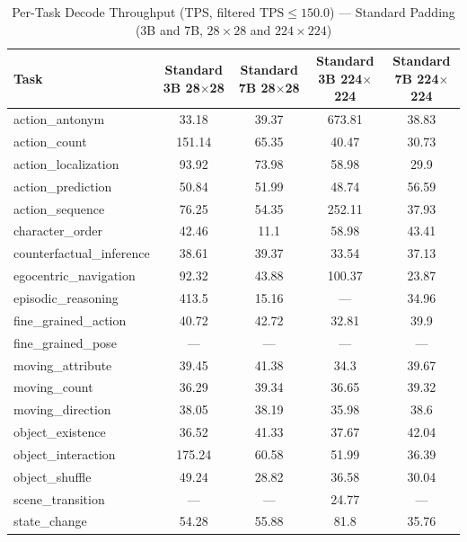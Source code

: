 \documentclass[conference]{IEEEtran}
\begin{document}
\begin{table}[!t]
  \centering
  \caption{Per-Task Decode Throughput (TPS, filtered $\text{TPS} \leq 150.0$)
           --- Standard Padding (3B and 7B, $28{\times}28$ and $224{\times}224$)}
  \label{tab:standard_tps}
  \begin{tabular}{lcccc}
    \toprule
    \textbf{Task}
      & \textbf{Standard 3B 28$\times$28}
      & \textbf{Standard 7B 28$\times$28}
      & \textbf{Standard 3B 224$\times$224}
      & \textbf{Standard 7B 224$\times$224} \\
    \midrule
    action\_antonym            & 33.18  & 39.37  & 673.81 & 38.83 \\
    action\_count              & 151.14 & 65.35  & 40.47  & 30.73 \\
    action\_localization       & 93.92  & 73.98  & 58.98  & 29.9  \\
    action\_prediction         & 50.84  & 51.99  & 48.74  & 56.59 \\
    action\_sequence           & 76.25  & 54.35  & 252.11 & 37.93 \\
    character\_order           & 42.46  & 11.1   & 58.98  & 43.41 \\
    counterfactual\_inference  & 38.61  & 39.37  & 33.54  & 37.13 \\
    egocentric\_navigation     & 92.32  & 43.88  & 100.37 & 23.87 \\
    episodic\_reasoning        & 413.5  & 15.16  & ---    & 34.96 \\
    fine\_grained\_action      & 40.72  & 42.72  & 32.81  & 39.9  \\
    fine\_grained\_pose        & ---    & ---    & ---    & ---   \\
    moving\_attribute          & 39.45  & 41.38  & 34.3   & 39.67 \\
    moving\_count              & 36.29  & 39.34  & 36.65  & 39.32 \\
    moving\_direction          & 38.05  & 38.19  & 35.98  & 38.6  \\
    object\_existence          & 36.52  & 41.33  & 37.67  & 42.04 \\
    object\_interaction        & 175.24 & 60.58  & 51.99  & 36.39 \\
    object\_shuffle            & 49.24  & 28.82  & 36.58  & 30.04 \\
    scene\_transition          & ---    & ---    & 24.77  & ---   \\
    state\_change              & 54.28  & 55.88  & 81.8   & 35.76 \\

\end{tabular}
\end{table}
\end{document}

